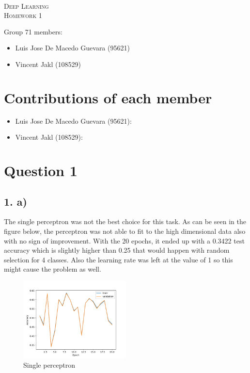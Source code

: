 \documentclass[11pt]{article}
\begin{document}
\begin{center}
  \mbox{}\\[2.0cm]
  \textsc{\Huge Deep Learning}\\[1.0cm]
  \textsc{\Large Homework 1}\\[0.5cm]
\end{center}
\begin{flushleft}
  Group 71 members: \\[0.5cm]
  \begin{itemize}
  \item Luis Jose De Macedo Guevara (95621)
  \item Vincent Jakl (108529)
  \end{itemize}
\end{flushleft}

\section{Contributions of each member}
\begin{itemize}
    \item Luis Jose De Macedo Guevara (95621):
    \item Vincent Jakl (108529):
\end{itemize}
\pagebreak
\section{Question 1}
\subsection{1. a)}
The single perceptron was not the best choice for this task.
As can be seen in the figure below, the perceptron was not able to fit to the high dimensional data also with no sign of improvement.
With the 20 epochs, it ended up with a 0.3422 test accuracy which is slightly higher than 0.25 that would happen with random selection for 4 classes.
Also the learning rate was left at the value of 1 so this might cause the problem as well.
\begin{figure}[h!]
  \centering
  \includegraphics[width=0.5\textwidth]{./plots/single_perceptron.png}
  \caption{Single perceptron}\label{fig:single_layer_perceptron}
\end{figure}
\end{document}
